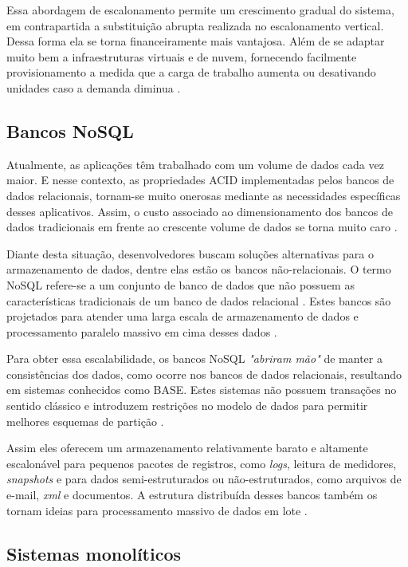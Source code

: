 Essa abordagem de escalonamento permite um crescimento gradual do sistema, em
contrapartida a substituição abrupta realizada no escalonamento vertical. Dessa
forma ela se torna financeiramente mais vantajosa. Além de se adaptar muito bem
a infraestruturas virtuais e de nuvem, fornecendo facilmente provisionamento
a medida que a carga de trabalho aumenta ou desativando unidades caso a demanda
diminua \cite{InterSystems2019}.

\subsection{Bancos NoSQL}

Atualmente, as aplicações têm trabalhado com um volume de dados cada vez maior.
E nesse contexto, as propriedades \gls{ACID} implementadas pelos bancos de dados relacionais,
tornam-se muito onerosas mediante as necessidades específicas desses aplicativos.
Assim, o custo associado ao dimensionamento dos bancos de dados tradicionais em
frente ao crescente volume de dados se torna muito caro \cite{Gajendran}.

Diante desta situação, desenvolvedores buscam soluções alternativas para o
armazenamento de dados, dentre elas estão os bancos não-relacionais. O termo
\gls{NoSQL} refere-se a um conjunto de banco de dados que não possuem as características
tradicionais de um banco de dados relacional \cite{Gajendran}. Estes bancos são projetados
para atender uma larga escala de armazenamento de dados e processamento paralelo
massivo em cima desses dados \cite{NewEraOfDatabases}.

Para obter essa escalabilidade, os bancos \gls{NoSQL} \textit{"abriram mão"} de
manter a consistências dos dados, como ocorre nos bancos de dados relacionais,
resultando em sistemas conhecidos como \gls{BASE}. Estes sistemas não possuem
transações no sentido clássico e introduzem restrições no modelo de dados
para permitir melhores esquemas de partição .

Assim eles oferecem um armazenamento relativamente barato e altamente escalonável
para pequenos pacotes de registros, como \textit{logs}, leitura de medidores,
\textit{snapshots} e para dados semi-estruturados ou não-estruturados, como arquivos
de e-mail, \textit{xml} e documentos. A estrutura distribuída desses bancos também
os tornam ideias para processamento massivo de dados em lote \cite{NewEraOfDatabases}.

\subsection{Sistemas monolíticos}


